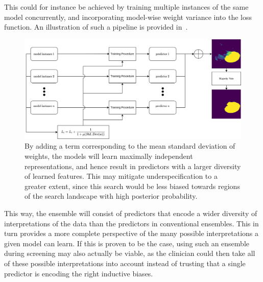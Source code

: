     This could for instance be achieved by training multiple instances of the same model concurrently, and incorporating model-wise weight variance into the loss function. An illustration of such a pipeline is provided in~.
    
    \begin{figure}[htb]
        \centering
        \includegraphics[width=\linewidth]{illustrations/diversity_search.png}
        \caption[Deep Diversity Search]{By adding a term corresponding to the mean standard deviation of weights, the models will learn maximally independent representations, and hence result in predictors with a larger diversity of learned features. This may mitigate underspecification to a greater extent, since this search would be less biased towards regions of the search landscape with high posterior probability.}
        \label{fig:diversity}
    \end{figure}
    
    This way, the ensemble will consist of predictors that encode a wider diversity of interpretations of the data than the predictors in conventional ensembles. This in turn provides a more complete perspective of the many possible interpretations a given model can learn. If this is proven to be the case, using such an ensemble during screening may also actually be viable, as the clinician could then take all of these possible interpretations into account instead of trusting that a single predictor is encoding the right inductive biases.  
